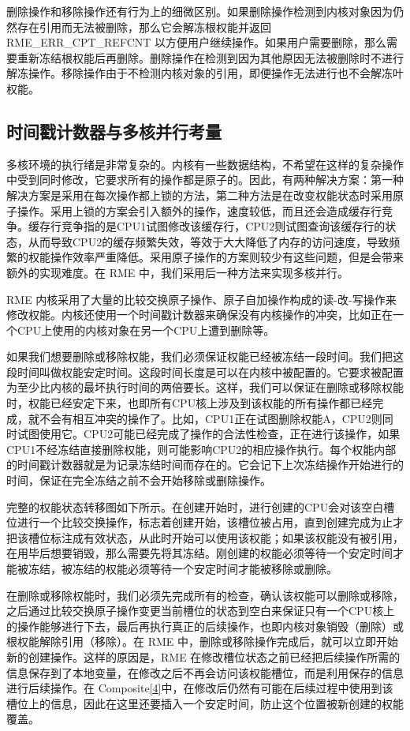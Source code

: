删除操作和移除操作还有行为上的细微区别。如果删除操作检测到内核对象因为仍然存在引用而无法被删除，那么它会解冻根权能并返回 RME\_ERR\_CPT\_REFCNT 以方便用户继续操作。如果用户需要删除，那么需要重新冻结根权能后再删除。删除操作在检测到因为其他原因无法被删除时不进行解冻操作。移除操作由于不检测内核对象的引用，即便操作无法进行也不会解冻叶权能。

\subsection{时间戳计数器与多核并行考量}\label{subsec:2-timestamp-counter-and-multicore-parallelism}

多核环境的执行绪是非常复杂的。内核有一些数据结构，不希望在这样的复杂操作中受到同时修改，它要求所有的操作都是原子的。因此，有两种解决方案：第一种解决方案是采用在每次操作都上锁的方法，第二种方法是在改变权能状态时采用原子操作。采用上锁的方案会引入额外的操作，速度较低，而且还会造成缓存行竞争。缓存行竞争指的是CPU1试图修改该缓存行，CPU2则试图查询该缓存行的状态，从而导致CPU2的缓存频繁失效，等效于大大降低了内存的访问速度，导致频繁的权能操作效率严重降低。采用原子操作的方案则较少有这些问题，但是会带来额外的实现难度。在 RME 中，我们采用后一种方法来实现多核并行。

RME 内核采用了大量的比较交换原子操作、原子自加操作构成的读-改-写操作来修改权能。内核还使用一个时间戳计数器来确保没有内核操作的冲突，比如正在一个CPU上使用的内核对象在另一个CPU上遭到删除等。

如果我们想要删除或移除权能，我们必须保证权能已经被冻结一段时间。我们把这段时间叫做权能安定时间。这段时间长度是可以在内核中被配置的。它要求被配置为至少比内核的最坏执行时间的两倍要长。这样，我们可以保证在删除或移除权能时，权能已经安定下来，也即所有CPU核上涉及到该权能的所有操作都已经完成，就不会有相互冲突的操作了。比如，CPU1正在试图删除权能A，CPU2则同时试图使用它。CPU2可能已经完成了操作的合法性检查，正在进行该操作，如果CPU1不经冻结直接删除权能，则可能影响CPU2的相应操作执行。每个权能内部的时间戳计数器就是为记录冻结时间而存在的。它会记下上次冻结操作开始进行的时间，保证在完全冻结之前不会开始移除或删除操作。

完整的权能状态转移图如下所示。在创建开始时，进行创建的CPU会对该空白槽位进行一个比较交换操作，标志着创建开始，该槽位被占用，直到创建完成为止才把该槽位标注成有效状态，从此时开始可以使用该权能；如果该权能没有被引用，在用毕后想要销毁，那么需要先将其冻结。刚创建的权能必须等待一个安定时间才能被冻结，被冻结的权能必须等待一个安定时间才能被移除或删除。

在删除或移除权能时，我们必须先完成所有的检查，确认该权能可以删除或移除，之后通过比较交换原子操作变更当前槽位的状态到空白来保证只有一个CPU核上的操作能够进行下去，最后再执行真正的后续操作，也即内核对象销毁（删除）或根权能解除引用（移除）。在 RME 中，删除或移除操作完成后，就可以立即开始新的创建操作。这样的原因是，RME 在修改槽位状态之前已经把后续操作所需的信息保存到了本地变量，在修改之后不再会访问该权能槽位，而是利用保存的信息进行后续操作。在 Composite\hyperref[cite:2-4]{{[}4{]}}中，在修改后仍然有可能在后续过程中使用到该槽位上的信息，因此在这里还要插入一个安定时间，防止这个位置被新创建的权能覆盖。

